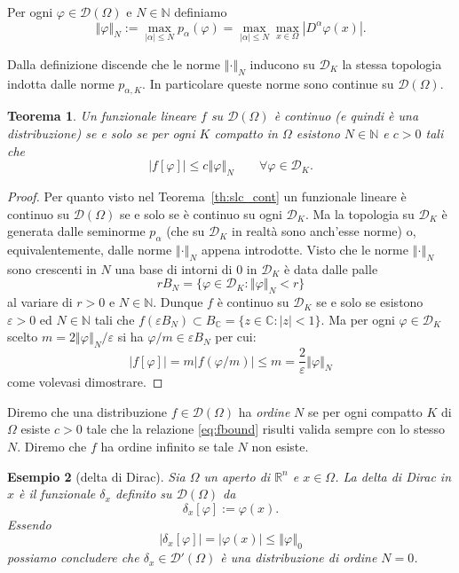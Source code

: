 \documentclass[italian,a4paper,oneside,headinclude]{scrbook}
\newcommand{\eps}{\varepsilon}
\renewcommand{\phi}{\varphi}
\newcommand{\D}{\mathcal D}
\newcommand{\CC}{\mathbb C}
\newcommand{\NN}{\mathbb N}
\newcommand{\RR}{\mathbb R}
\newcommand{\abs}[1]{{\left|#1\right|}}
\newcommand{\Abs}[1]{{\left\Vert #1\right\Vert}}
\newcommand{\defeq}{:=}
\newtheorem{theorem}{Teorema}
\newtheorem{example}[theorem]{Esempio}
\begin{document}
Per ogni $\phi \in \D(\Omega)$ e $N\in \NN$ definiamo
\[
\Abs{\phi}_N
\defeq \max_{\abs{\alpha}\le N} p_\alpha(\phi)
= \max_{\abs{\alpha}\le N} \max_{x\in \Omega}
\abs{D^\alpha\phi(x)}.
\]

Dalla definizione discende che le norme $\Abs{\cdot}_N$ inducono su
$\D_K$ la stessa topologia indotta dalle norme $p_{\alpha,K}$. In
particolare queste norme sono continue su $\D(\Omega)$.

\begin{theorem}
  Un funzionale lineare $f$ su $\D(\Omega)$ è continuo (e quindi
  è una distribuzione) se e solo se per ogni $K$ compatto in $\Omega$
  esistono $N\in \NN$ e $c>0$ tali che
  \begin{equation}\label{eq:fbound}
     \abs{f[\phi]} \le c \Abs{\phi}_N\qquad \forall \phi \in \D_K.
  \end{equation}
\end{theorem}
%
\begin{proof}
  Per quanto visto nel Teorema~\ref{th:slc_cont} un funzionale lineare è continuo su
  $\D(\Omega)$ se e solo se è continuo su ogni $\D_K$. Ma la topologia
  su $\D_K$ è generata dalle seminorme $p_\alpha$ (che su $\D_K$ in
  realtà sono anch'esse norme) o, equivalentemente,
  dalle norme $\Abs{\cdot}_N$ appena introdotte.
  Visto che le
  norme $\Abs{\cdot}_N$ sono crescenti in $N$ una base di intorni di
  $0$ in $\D_K$ è data dalle palle
  \[
  rB_N = \{\phi \in \D_K\colon \Abs{\phi}_N < r\}
  \]
  al variare di $r>0$ e $N\in \NN$.
  Dunque $f$ è continuo su $\D_K$ se e solo se esistono $\eps>0$ ed
  $N\in \NN$ tali che
  $f(\eps B_N) \subset B_\CC = \{z\in \CC\colon \abs{z}<1\}$.
  Ma per ogni $\phi\in \D_K$ scelto $m=2\Abs{\phi}_N / \eps$ si ha
  $\phi/m \in \eps B_N$ per cui:
  \[
  \abs{f[\phi]} = m \abs{f(\phi/m)} \le m = \frac{2}{\eps} \Abs{\phi}_N
  \]
  come volevasi dimostrare.
\end{proof}

Diremo che una distribuzione $f\in \D(\Omega)$ ha \emph{ordine} $N$ se
per ogni compatto $K$ di $\Omega$ esiste $c>0$
tale che la relazione \eqref{eq:fbound} risulti valida sempre con lo
stesso $N$.
Diremo che $f$ ha ordine infinito se tale $N$ non esiste.

\begin{example}[delta di Dirac]
  Sia $\Omega$ un aperto di $\RR^n$ e $x\in \Omega$.
  La \emph{delta di Dirac} in $x$
  è il funzionale $\delta_x$
  definito su $\D(\Omega)$ da
  \[
  \delta_x[\phi] \defeq \phi(x).
  \]
  Essendo
  \[
  \abs{\delta_x[\phi]} = \abs{\phi(x)} \le \Abs{\phi}_0
  \]
  possiamo concludere che $\delta_x \in \D'(\Omega)$ è una distribuzione
  di ordine $N=0$.
\end{example}
\end{document}
